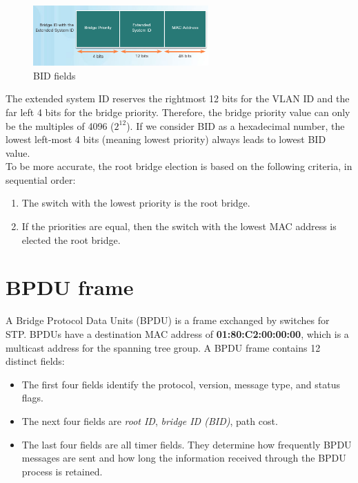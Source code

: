 \begin{figure}[hbtp]
\centering
\includegraphics[width=0.6\textwidth]{pictures/BID.png}
\caption{BID fields}
\label{BID}
\end{figure}

The extended system ID reserves the rightmost 12 bits for the VLAN ID and the far left 4 bits for the bridge priority. Therefore, the bridge priority value can only be the multiples of 4096 ($2^12$). If we consider BID as a hexadecimal number, the lowest left-most 4 bits (meaning lowest priority) always leads to lowest BID value.\\

To be more accurate, the root bridge election is based on the following criteria, in sequential order:

\begin{enumerate}
\item The switch with the lowest priority is the root bridge.
\item If the priorities are equal, then the switch with the lowest MAC address is elected the root bridge.
\end{enumerate}

\section{BPDU frame}

A Bridge Protocol Data Units (BPDU) is a frame exchanged by switches for STP. BPDUs have a destination MAC address of \textbf{01:80:C2:00:00:00}, which is a multicast address for the spanning tree group. A BPDU frame contains 12 distinct fields:

\begin{itemize}
\item The first four fields identify the protocol, version, message type, and status flags.
\item The next four fields are \textit{root ID}, \textit{bridge ID (BID)}, path cost.
\item The last four fields are all timer fields. They determine how frequently BPDU messages are sent and how long the information received through the BPDU process is retained.
\end{itemize}

